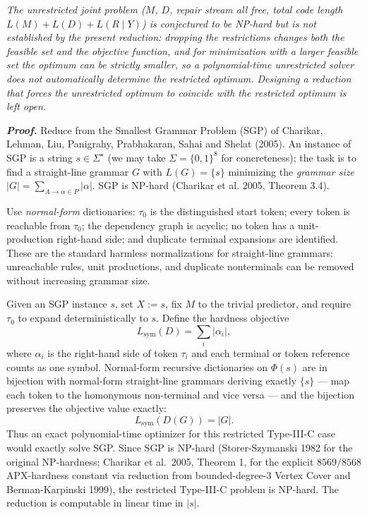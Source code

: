 \documentclass[
]{article}
\begin{document}
\emph{The unrestricted joint problem ($M$, $D$, repair stream all
free, total code length $L(M) + L(D) + L(R\mid Y)$) is conjectured
to be NP-hard but is not established by the present reduction:
dropping the restrictions changes both the feasible set and the
objective function, and for minimization with a larger feasible set
the optimum can be strictly smaller, so a polynomial-time
unrestricted solver does not automatically determine the restricted
optimum. Designing a reduction that forces the unrestricted optimum
to coincide with the restricted optimum is left open.}

\emph{\textbf{Proof.}} Reduce from the Smallest Grammar Problem (SGP)
of Charikar, Lehman, Liu, Panigrahy, Prabhakaran, Sahai and Shelat
(2005). An instance of SGP is a string $s \in \Sigma^\star$ (we may
take $\Sigma = \{0,1\}^8$ for concreteness); the task is to find a
straight-line grammar $G$ with $L(G) = \{s\}$ minimizing the
\emph{grammar size}
$|G| = \sum_{A \to \alpha \in P} |\alpha|$. SGP is NP-hard (Charikar
et al. 2005, Theorem 3.4).

Use \emph{normal-form} dictionaries: $\tau_0$ is the distinguished
start token; every token is reachable from $\tau_0$; the dependency
graph is acyclic; no token has a unit-production right-hand side; and
duplicate terminal expansions are identified. These are the standard
harmless normalizations for straight-line grammars: unreachable
rules, unit productions, and duplicate nonterminals can be removed
without increasing grammar size.

Given an SGP instance $s$, set $X := s$, fix $M$ to the trivial
predictor, and require $\tau_0$ to expand deterministically to $s$.
Define the hardness objective
\[
L_{\mathrm{sym}}(D) = \sum_i |\alpha_i|,
\]
where $\alpha_i$ is the right-hand side of token $\tau_i$ and each
terminal or token reference counts as one symbol. Normal-form
recursive dictionaries on $\Phi(s)$ are in bijection with normal-form
straight-line grammars deriving exactly $\{s\}$ --- map each token to
the homonymous non-terminal and vice versa --- and the bijection
preserves the objective value exactly:
\[
L_{\mathrm{sym}}(D(G)) = |G|.
\]
Thus an exact polynomial-time optimizer for this restricted
Type-III-C case would exactly solve SGP. Since SGP is NP-hard
(Storer-Szymanski 1982 for the original NP-hardness; Charikar et
al.\ 2005, Theorem 1, for the explicit $8569/8568$ APX-hardness
constant via reduction from bounded-degree-3 Vertex Cover and
Berman-Karpinski 1999), the restricted Type-III-C problem is
NP-hard. The reduction is computable in linear time in $|s|$.
\end{document}
